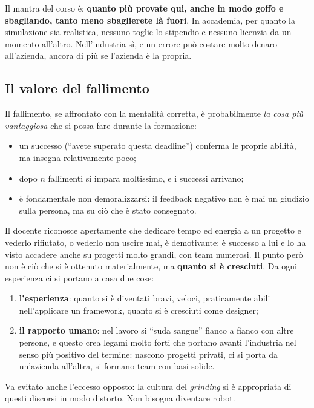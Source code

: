 Il mantra del corso è: \textbf{quanto più provate qui, anche in modo goffo e
sbagliando, tanto meno sbaglierete là fuori}. In accademia, per quanto la
simulazione sia realistica, nessuno toglie lo stipendio e nessuno licenzia da
un momento all'altro. Nell'industria sì, e un errore può costare molto denaro
all'azienda, ancora di più se l'azienda è la propria.

\subsection{Il valore del fallimento}

Il fallimento, se affrontato con la mentalità corretta, è probabilmente
\emph{la cosa più vantaggiosa} che si possa fare durante la formazione:
\begin{itemize}
  \item un successo (``avete superato questa deadline'') conferma le proprie
        abilità, ma insegna relativamente poco;
  \item dopo $n$ fallimenti si impara moltissimo, e i successi arrivano;
  \item è fondamentale non demoralizzarsi: il feedback negativo non è mai un
        giudizio sulla persona, ma su ciò che è stato consegnato.
\end{itemize}

Il docente riconosce apertamente che dedicare tempo ed energia a un progetto e
vederlo rifiutato, o vederlo non uscire mai, è demotivante: è successo a lui e
lo ha visto accadere anche su progetti molto grandi, con team numerosi. Il
punto però non è ciò che si è ottenuto materialmente, ma \textbf{quanto si è
cresciuti}. Da ogni esperienza ci si portano a casa due cose:
\begin{enumerate}
  \item \textbf{l'esperienza}: quanto si è diventati bravi, veloci,
        praticamente abili nell'applicare un framework, quanto si è cresciuti
        come designer;
  \item \textbf{il rapporto umano}: nel lavoro si ``suda sangue'' fianco a
        fianco con altre persone, e questo crea legami molto forti che
        portano avanti l'industria nel senso più positivo del termine: nascono
        progetti privati, ci si porta da un'azienda all'altra, si formano team
        con basi solide.
\end{enumerate}

Va evitato anche l'eccesso opposto: la cultura del \emph{grinding} si è
appropriata di questi discorsi in modo distorto. Non bisogna diventare robot.

